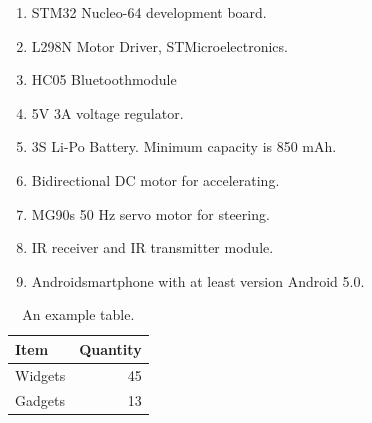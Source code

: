\begin{enumerate}
    \item STM32 Nucleo-64 development board.
    \item L298N Motor Driver, STMicroelectronics\texttrademark.
    \item HC05 Bluetooth\texttrademark\;module
    \item 5V 3A voltage regulator.
    \item 3S Li-Po Battery. Minimum capacity is 850 mAh.
    \item Bidirectional DC motor for accelerating.
    \item MG90s 50 Hz servo motor for steering. 
    \item IR receiver and IR transmitter module.
    \item Android\texttrademark\;smartphone with at least version Android 5.0.
\end{enumerate}

\begin{table}[!htbp]
    \centering
    \caption{\label{tab:widgets}An example table.}
    \begin{tabular}{l|r}
        Item & Quantity \\\hline
        Widgets & 45 \\
        Gadgets & 13
    \end{tabular}
\end{table}